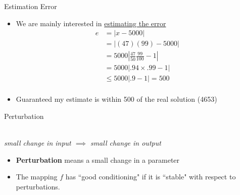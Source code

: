 \documentclass[10pt]{beamer}
\begin{document}
\begin{frame}{Estimation Error}

\begin{itemize}
    \item We are mainly interested in \underline{estimating the error} 
    \begin{align*}
        e &= |x-5000| \\
          & =| (47)(99) - 5000| \\  
          & = 5000\left| \frac{47}{50} \frac{99}{100} - 1\right| \\  
          & = 5000\left| .94\times .99 - 1\right| \\
          & \le 5000  \left| .9 - 1\right| = 500\\  
    \end{align*}
    \item Guaranteed my estimate is within 500 of the real solution (4653)
\end{itemize}    
\end{frame}


\begin{frame}{Perturbation}
\begin{center}
\\
\textit{small change in input $\implies$ small change in output}
\end{center}

\vspace{4mm}

\begin{itemize}
    \item \textbf{Perturbation} means a small change in a parameter
    \item The mapping $f$ has ``good conditioning" if it is ``stable" with respect to perturbations.
\end{itemize}
\end{frame}
\end{document}
